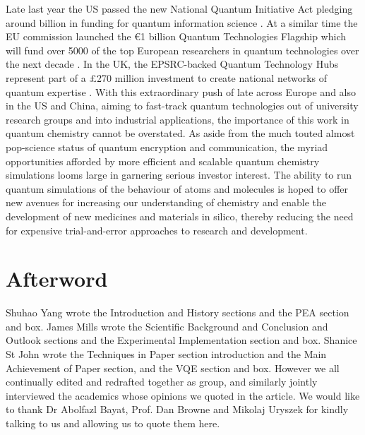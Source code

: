 \documentclass[12pt]{article}
\begin{document}
Late last year the US passed the new National Quantum Initiative Act pledging around  billion in funding for quantum information science
 \cite{usbill}. At a similar time the EU commission launched the €1 billion Quantum Technologies Flagship which will fund over 5000 of the top
 European researchers in quantum technologies over the next decade \cite{eubill}. In the UK, the EPSRC-backed Quantum Technology Hubs represent
 part of a £270 million investment to create national networks of quantum expertise \cite{ukbill}. With this extraordinary push of late across
 Europe and also in the US and China, aiming to fast-track quantum technologies out of university research groups and into industrial applications,
 the importance of this work in quantum chemistry cannot be overstated. As aside from the much touted almost pop-science status of
 quantum encryption and communication, the myriad opportunities afforded by more efficient and scalable quantum chemistry simulations looms large
 in garnering serious investor interest. The ability to run quantum simulations of the behaviour of atoms and molecules is hoped to offer new
 avenues for increasing our understanding of chemistry and enable the development of new medicines and materials in silico, thereby reducing
 the need for expensive trial-and-error approaches to research and development.

\section{Afterword}

Shuhao Yang wrote the Introduction and History sections and the PEA section and box. James Mills wrote the Scientific Background and Conclusion
and Outlook sections and the Experimental Implementation section and box. Shanice St John wrote the Techniques in Paper section introduction and
the Main Achievement of Paper section, and the VQE section and box. However we all continually edited and redrafted together as group, and similarly
 jointly interviewed the academics whose opinions we quoted in the article. We would like to thank Dr Abolfazl Bayat, Prof. Dan Browne and Mikolaj
 Uryszek for kindly talking to us and allowing us to quote them here.



\end{document}
